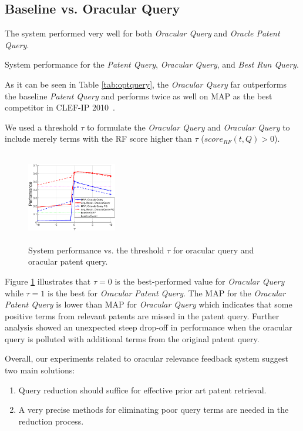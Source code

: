\subsection{Baseline vs. Oracular Query}
The system performed very well for both {\em Oracular Query} and {\em Oracle Patent Query}.  
\begin{table}[htpb]
  \begin{center}
   \caption{System performance for the {\em Patent Query}, {\em Oracular Query}, and {\em Best Run Query}.}
   \vspace*{1ex}
     
  \label{tab:optquery}
  \end{center}  
\end{table}
As it can be seen in Table \ref{tab:optquery}, the {\em Oracular Query} far outperforms the baseline {\em Patent Query} and performs twice as well on MAP as the best competitor in CLEF-IP 2010~\cite{lopez2010experiments}.

We used a threshold $\tau$ to formulate the {\em Oracular Query} and {\em Oracular Query} to include merely terms with the RF score higher than $\tau$ ($score_{RF}(t,Q)>0$). 
\begin{figure}[htpb]
   \centering
   \includegraphics[width=0.35\textwidth,height=40mm]{figs/oracularquery1.eps}
   \caption{System performance vs. the threshold $\tau$ for oracular query and oracular patent query.}   
   \label{fig:oracular} 
\end{figure} 
Figure \ref{fig:oracular} illustrates that $\tau=0$ is the best-performed value for {\em Oracular Query} while $\tau=1$ is the best for {\em Oracular Patent Query}. The MAP for the {\em Oracular Patent Query} is lower than MAP for {\em Oracular Query} which indicates that some positive terms from relevant patents are missed in the patent query. Further analysis showed an unexpected steep drop-off in performance when the oracular query is polluted with additional terms from the original patent query. 

Overall, our experiments related to oracular relevance feedback system suggest two main solutions:
\begin{enumerate}
  \item Query reduction should suffice for effective prior art patent retrieval.
  \item A very precise methods for eliminating poor query terms are needed in the reduction process.
\end{enumerate}